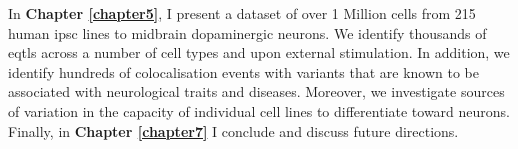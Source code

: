 In \textbf{Chapter 
\ref{chapter5}}, I present a dataset of over 1 Million cells from 215 human \gls{ipsc} lines to midbrain dopaminergic neurons.
We identify thousands of \glspl{eqtl} across a number of cell types and upon external stimulation.
In addition, we identify hundreds of colocalisation events with variants that are known to be associated with neurological traits and diseases.
Moreover, we investigate sources of variation in the capacity of individual cell lines to differentiate toward neurons.\\


Finally, in \textbf{Chapter 
\ref{chapter7}} I conclude and discuss future directions.